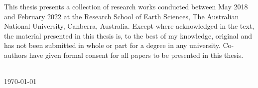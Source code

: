 \begin{declaration}
\begingroup
\large
\noindent This thesis presents a collection of research works conducted between May 2018 and February 2022 at the Research School of Earth Sciences, The Australian National University, Canberra, Australia. Except where acknowledged in the text, the material presented in this thesis is, to the best of my knowledge, original and has not been submitted in whole or part for a degree in any university. Co-authors have given formal consent for all papers to be presented in this thesis.


\bigskip
\vspace{1cm}
\begin{flushright}
\authorname\\
\today
\end{flushright}
\endgroup
\end{declaration}
\vspace{3cm}
\begingroup
\endgroup
\cleardoublepage


 
